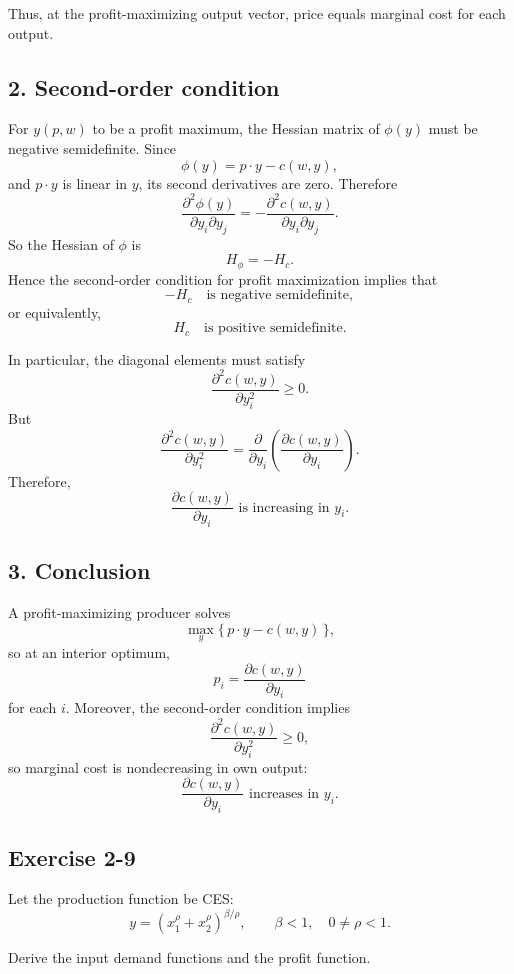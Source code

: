 Thus, at the profit-maximizing output vector, price equals marginal cost for each output.

\subsection*{2. Second-order condition}

For \(y(p,w)\) to be a profit maximum, the Hessian matrix of \(\phi(y)\) must be negative semidefinite. Since
\[
\phi(y)=p\cdot y-c(w,y),
\]
and \(p\cdot y\) is linear in \(y\), its second derivatives are zero. Therefore
\[
\frac{\partial^2 \phi(y)}{\partial y_i\partial y_j}
=
-\frac{\partial^2 c(w,y)}{\partial y_i\partial y_j}.
\]
So the Hessian of \(\phi\) is
\[
H_\phi=-H_c.
\]
Hence the second-order condition for profit maximization implies that
\[
-H_c \quad \text{is negative semidefinite},
\]
or equivalently,
\[
H_c \quad \text{is positive semidefinite}.
\]

In particular, the diagonal elements must satisfy
\[
\frac{\partial^2 c(w,y)}{\partial y_i^2}\ge 0.
\]
But
\[
\frac{\partial^2 c(w,y)}{\partial y_i^2}
=
\frac{\partial}{\partial y_i}
\left(
\frac{\partial c(w,y)}{\partial y_i}
\right).
\]
Therefore,
\[
\boxed{
\frac{\partial c(w,y)}{\partial y_i}
\text{ is increasing in } y_i.
}
\]

\subsection*{3. Conclusion}

A profit-maximizing producer solves
\[
\max_y \{\,p\cdot y-c(w,y)\,\},
\]
so at an interior optimum,
\[
\boxed{
p_i=\frac{\partial c(w,y)}{\partial y_i}
}
\]
for each \(i\). Moreover, the second-order condition implies
\[
\frac{\partial^2 c(w,y)}{\partial y_i^2}\ge 0,
\]
so marginal cost is nondecreasing in own output:
\[
\boxed{
\frac{\partial c(w,y)}{\partial y_i}
\text{ increases in } y_i.
}
\]



\vspace{30pt}
\begin{tcolorbox}[breakable]

\subsection*{Exercise 2-9}

Let the production function be CES:
\[
y = \left(x_1^\rho + x_2^\rho\right)^{\beta/\rho},
\qquad \beta<1,\quad 0\ne \rho<1.
\]

Derive the input demand functions and the profit function.


\end{tcolorbox}


